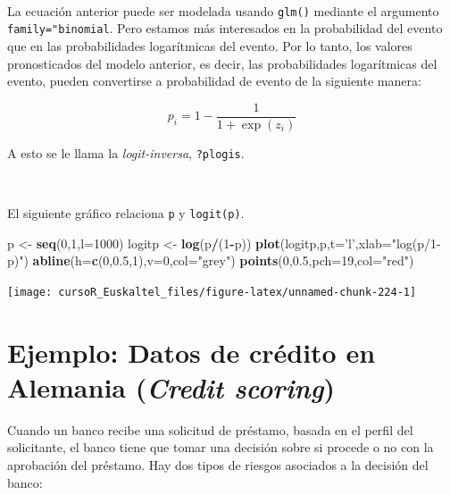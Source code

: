 \documentclass[]{book}
\newenvironment{Shaded}{\begin{snugshade}}{\end{snugshade}}
\newcommand{\KeywordTok}[1]{\textcolor[rgb]{0.13,0.29,0.53}{\textbf{#1}}}
\newcommand{\DataTypeTok}[1]{\textcolor[rgb]{0.13,0.29,0.53}{#1}}
\newcommand{\DecValTok}[1]{\textcolor[rgb]{0.00,0.00,0.81}{#1}}
\newcommand{\FloatTok}[1]{\textcolor[rgb]{0.00,0.00,0.81}{#1}}
\newcommand{\StringTok}[1]{\textcolor[rgb]{0.31,0.60,0.02}{#1}}
\newcommand{\OperatorTok}[1]{\textcolor[rgb]{0.81,0.36,0.00}{\textbf{#1}}}
\newcommand{\NormalTok}[1]{#1}
\begin{document}
~

La ecuación anterior puede ser modelada usando \texttt{glm()} mediante
el argumento \texttt{family="binomial}. Pero estamos más interesados en
la probabilidad del evento que en las probabilidades logarítmicas del
evento. Por lo tanto, los valores pronosticados del modelo anterior, es
decir, las probabilidades logarítmicas del evento, pueden convertirse a
probabilidad de evento de la siguiente manera:

\[
  p_i =1-\frac{1}{1 + \exp(z_i)}
\]

A esto se le llama la \emph{logit-inversa}, \texttt{?plogis}.

~

El siguiente gráfico relaciona \texttt{p} y \texttt{logit(p)}.

\begin{Shaded}
\begin{Highlighting}[]
\NormalTok{p <-}\StringTok{ }\KeywordTok{seq}\NormalTok{(}\DecValTok{0}\NormalTok{,}\DecValTok{1}\NormalTok{,}\DataTypeTok{l=}\DecValTok{1000}\NormalTok{)}
\NormalTok{logitp <-}\StringTok{ }\KeywordTok{log}\NormalTok{(p}\OperatorTok{/}\NormalTok{(}\DecValTok{1}\OperatorTok{-}\NormalTok{p))}
\KeywordTok{plot}\NormalTok{(logitp,p,}\DataTypeTok{t=}\StringTok{'l'}\NormalTok{,}\DataTypeTok{xlab=}\StringTok{"log(p/1-p)"}\NormalTok{)}
\KeywordTok{abline}\NormalTok{(}\DataTypeTok{h=}\KeywordTok{c}\NormalTok{(}\DecValTok{0}\NormalTok{,}\FloatTok{0.5}\NormalTok{,}\DecValTok{1}\NormalTok{),}\DataTypeTok{v=}\DecValTok{0}\NormalTok{,}\DataTypeTok{col=}\StringTok{"grey"}\NormalTok{)}
\KeywordTok{points}\NormalTok{(}\DecValTok{0}\NormalTok{,}\FloatTok{0.5}\NormalTok{,}\DataTypeTok{pch=}\DecValTok{19}\NormalTok{,}\DataTypeTok{col=}\StringTok{"red"}\NormalTok{)}
\end{Highlighting}
\end{Shaded}

\begin{center}\texttt{[image: cursoR\_Euskaltel\_files/figure-latex/unnamed-chunk-224-1]} \end{center}

\section{\texorpdfstring{Ejemplo: Datos de crédito en Alemania
(\emph{Credit
scoring})}{Ejemplo: Datos de crédito en Alemania (Credit scoring)}}\label{ejemplo-datos-de-credito-en-alemania-credit-scoring}

Cuando un banco recibe una solicitud de préstamo, basada en el perfil
del solicitante, el banco tiene que tomar una decisión sobre si procede
o no con la aprobación del préstamo. Hay dos tipos de riesgos asociados
a la decisión del banco:
\end{document}
